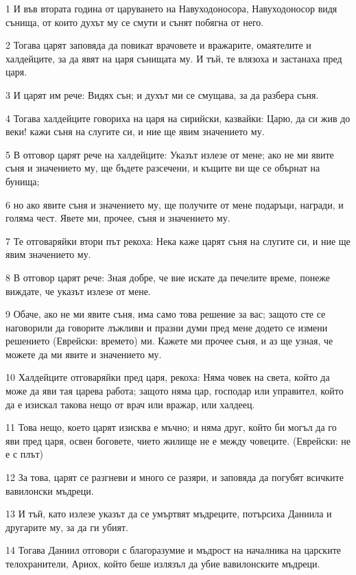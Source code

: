 \par 1 И във втората година от царуването на Навуходоносора, Навуходоносор видя сънища, от които духът му се смути и сънят побягна от него.
\par 2 Тогава царят заповяда да повикат врачовете и вражарите, омаятелите и халдейците, за да явят на царя сънищата му. И тъй, те влязоха и застанаха пред царя.
\par 3 И царят им рече: Видях сън; и духът ми се смущава, за да разбера съня.
\par 4 Тогава халдейците говориха на царя на сирийски, казвайки: Царю, да си жив до веки! кажи съня на слугите си, и ние ще явим значението му.
\par 5 В отговор царят рече на халдейците: Указът излезе от мене; ако не ми явите съня и значението му, ще бъдете разсечени, и къщите ви ще се обърнат на бунища;
\par 6 но ако явите съня и значението му, ще получите от мене подаръци, награди, и голяма чест. Явете ми, прочее, съня и значението му.
\par 7 Те отговаряйки втори път рекоха: Нека каже царят съня на слугите си, и ние ще явим значението му.
\par 8 В отговор царят рече: Зная добре, че вие искате да печелите време, понеже виждате, че указът излезе от мене.
\par 9 Обаче, ако не ми явите съня, има само това решение за вас; защото сте се наговорили да говорите лъжливи и празни думи пред мене додето се измени решението (Еврейски: времето) ми. Кажете ми прочее съня, и аз ще узная, че можете да ми явите и значението му.
\par 10 Халдейците отговаряйки пред царя, рекоха: Няма човек на света, който да може да яви тая царева работа; защото няма цар, господар или управител, който да е изискал такова нещо от врач или вражар, или халдеец.
\par 11 Това нещо, което царят изисква е мъчно; и няма друг, който би могъл да го яви пред царя, освен боговете, чието жилище не е между човеците. (Еврейски: не е с плът)
\par 12 За това, царят се разгневи и много се разяри, и заповяда да погубят всичките вавилонски мъдреци.
\par 13 И тъй, като излезе указът да се умъртвят мъдреците, потърсиха Даниила и другарите му, за да ги убият.
\par 14 Тогава Даниил отговори с благоразумие и мъдрост на началника на царските телохранители, Ариох, който беше излязъл да убие вавилонските мъдреци.

